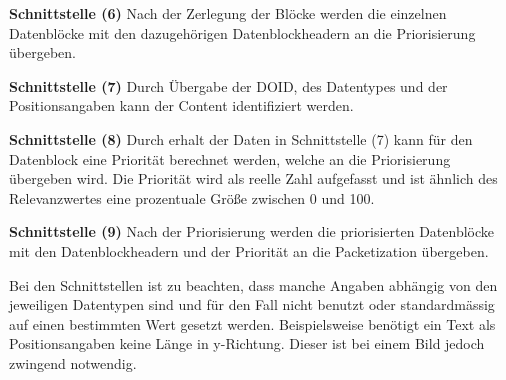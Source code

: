 \textbf{Schnittstelle (6)} \newline
Nach der Zerlegung der Blöcke werden die einzelnen
Datenblöcke mit den dazugehörigen Datenblockheadern an die
Priorisierung übergeben.

\textbf{Schnittstelle (7)} \newline
Durch Übergabe der DOID, des Datentypes und der Positionsangaben kann der
Content identifiziert werden.

\textbf{Schnittstelle (8)} \newline
Durch erhalt der Daten in Schnittstelle (7) kann für
den Datenblock eine Priorität berechnet werden, welche an die Priorisierung übergeben
wird. Die Priorität wird als reelle Zahl aufgefasst und ist ähnlich des
Relevanzwertes eine prozentuale Größe zwischen 0 und 100.

\textbf{Schnittstelle (9)} \newline
Nach der Priorisierung werden die priorisierten Datenblöcke mit den
Datenblockheadern und der Priorität an die Packetization übergeben.

Bei den Schnittstellen ist zu beachten, dass manche Angaben abhängig von den
jeweiligen Datentypen sind und für den Fall nicht benutzt oder
standardmässig auf einen bestimmten Wert gesetzt werden. Beispielsweise benötigt
ein Text als Positionsangaben keine Länge in y-Richtung. Dieser ist bei einem
Bild jedoch zwingend notwendig.
